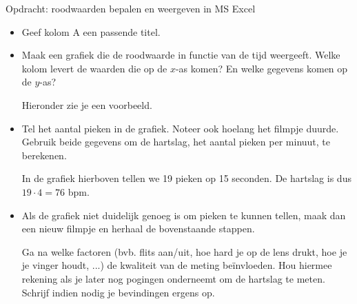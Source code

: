 \begin{opdracht}{Opdracht: roodwaarden bepalen en weergeven in MS Excel}
\begin{enumerate}
\begin{itemize}
		\item Geef kolom A een passende titel.
		
		\item Maak een grafiek die de roodwaarde in functie van de tijd weergeeft. Welke kolom levert de waarden die op de $x$-as komen? En welke gegevens komen op de $y$-as?
		
		Hieronder zie je een voorbeeld.
		
		
		\item Tel het aantal pieken in de grafiek. Noteer ook hoelang het filmpje duurde. Gebruik beide gegevens om de hartslag, het aantal pieken per minuut, te berekenen.
		
		In de grafiek hierboven tellen we 19 pieken op 15 seconden. De hartslag is dus $19 \cdot 4 = 76$ bpm.
		
		\item Als de grafiek niet duidelijk genoeg is om pieken te kunnen tellen, maak dan een nieuw filmpje en herhaal de bovenstaande stappen. 
		
		Ga na welke factoren (bvb. flits aan/uit, hoe hard je op de lens drukt, hoe je je vinger houdt, ...) de kwaliteit van de meting be\"invloeden. Hou hiermee rekening als je later nog pogingen onderneemt om de hartslag te meten. Schrijf indien nodig je bevindingen ergens op.
	\end{itemize}	

\end{enumerate}
	
\end{opdracht}

